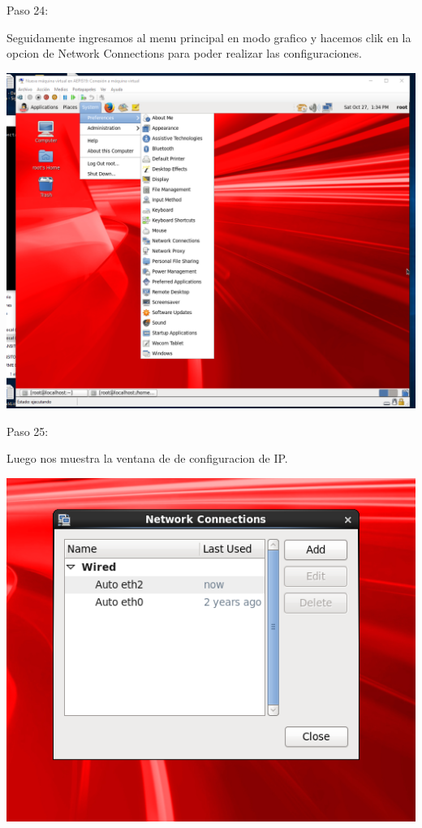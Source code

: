 \begin{itemize}
\begin{center}
    Paso 24:
\end{center}

    Seguidamente ingresamos al menu principal en modo grafico y hacemos clik en la opcion de Network Connections para poder realizar las configuraciones.
	\begin{center}
	\includegraphics[width=15cm]{./Imagenes/imagen24} 
	\end{center}

\end{itemize} 

\begin{itemize}
\begin{center}
    Paso 25: 
\end{center}

    Luego nos muestra la ventana de de configuracion de IP. 
	\begin{center}
	\includegraphics[width=15cm]{./Imagenes/imagen25} 
	\end{center}

\end{itemize} 

